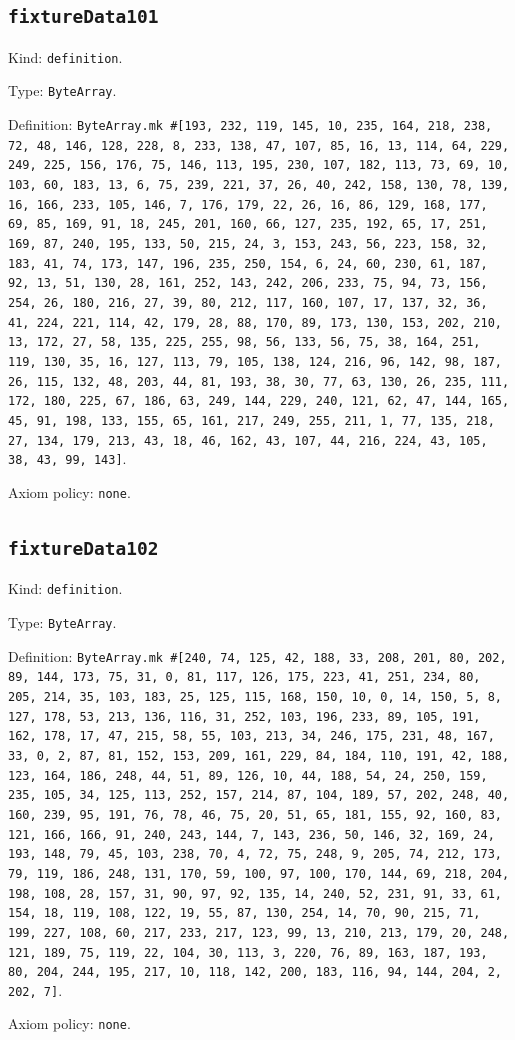 \documentclass[11pt]{article}
\begin{document}
\subsection*{\texttt{fixtureData101}}
\noindent Kind: \texttt{definition}.\par
\noindent Type: \texttt{ByteArray}.\par
\noindent Definition: \texttt{ByteArray.mk \#[193, 232, 119, 145, 10, 235, 164, 218, 238, 72, 48, 146, 128, 228, 8, 233, 138, 47, 107, 85, 16, 13, 114, 64, 229, 249, 225, 156, 176, 75, 146, 113, 195, 230, 107, 182, 113, 73, 69, 10, 103, 60, 183, 13, 6, 75, 239, 221, 37, 26, 40, 242, 158, 130, 78, 139, 16, 166, 233, 105, 146, 7, 176, 179, 22, 26, 16, 86, 129, 168, 177, 69, 85, 169, 91, 18, 245, 201, 160, 66, 127, 235, 192, 65, 17, 251, 169, 87, 240, 195, 133, 50, 215, 24, 3, 153, 243, 56, 223, 158, 32, 183, 41, 74, 173, 147, 196, 235, 250, 154, 6, 24, 60, 230, 61, 187, 92, 13, 51, 130, 28, 161, 252, 143, 242, 206, 233, 75, 94, 73, 156, 254, 26, 180, 216, 27, 39, 80, 212, 117, 160, 107, 17, 137, 32, 36, 41, 224, 221, 114, 42, 179, 28, 88, 170, 89, 173, 130, 153, 202, 210, 13, 172, 27, 58, 135, 225, 255, 98, 56, 133, 56, 75, 38, 164, 251, 119, 130, 35, 16, 127, 113, 79, 105, 138, 124, 216, 96, 142, 98, 187, 26, 115, 132, 48, 203, 44, 81, 193, 38, 30, 77, 63, 130, 26, 235, 111, 172, 180, 225, 67, 186, 63, 249, 144, 229, 240, 121, 62, 47, 144, 165, 45, 91, 198, 133, 155, 65, 161, 217, 249, 255, 211, 1, 77, 135, 218, 27, 134, 179, 213, 43, 18, 46, 162, 43, 107, 44, 216, 224, 43, 105, 38, 43, 99, 143]}.\par
\noindent Axiom policy: \texttt{none}.\par
\subsection*{\texttt{fixtureData102}}
\noindent Kind: \texttt{definition}.\par
\noindent Type: \texttt{ByteArray}.\par
\noindent Definition: \texttt{ByteArray.mk \#[240, 74, 125, 42, 188, 33, 208, 201, 80, 202, 89, 144, 173, 75, 31, 0, 81, 117, 126, 175, 223, 41, 251, 234, 80, 205, 214, 35, 103, 183, 25, 125, 115, 168, 150, 10, 0, 14, 150, 5, 8, 127, 178, 53, 213, 136, 116, 31, 252, 103, 196, 233, 89, 105, 191, 162, 178, 17, 47, 215, 58, 55, 103, 213, 34, 246, 175, 231, 48, 167, 33, 0, 2, 87, 81, 152, 153, 209, 161, 229, 84, 184, 110, 191, 42, 188, 123, 164, 186, 248, 44, 51, 89, 126, 10, 44, 188, 54, 24, 250, 159, 235, 105, 34, 125, 113, 252, 157, 214, 87, 104, 189, 57, 202, 248, 40, 160, 239, 95, 191, 76, 78, 46, 75, 20, 51, 65, 181, 155, 92, 160, 83, 121, 166, 166, 91, 240, 243, 144, 7, 143, 236, 50, 146, 32, 169, 24, 193, 148, 79, 45, 103, 238, 70, 4, 72, 75, 248, 9, 205, 74, 212, 173, 79, 119, 186, 248, 131, 170, 59, 100, 97, 100, 170, 144, 69, 218, 204, 198, 108, 28, 157, 31, 90, 97, 92, 135, 14, 240, 52, 231, 91, 33, 61, 154, 18, 119, 108, 122, 19, 55, 87, 130, 254, 14, 70, 90, 215, 71, 199, 227, 108, 60, 217, 233, 217, 123, 99, 13, 210, 213, 179, 20, 248, 121, 189, 75, 119, 22, 104, 30, 113, 3, 220, 76, 89, 163, 187, 193, 80, 204, 244, 195, 217, 10, 118, 142, 200, 183, 116, 94, 144, 204, 2, 202, 7]}.\par
\noindent Axiom policy: \texttt{none}.\par
\end{document}
